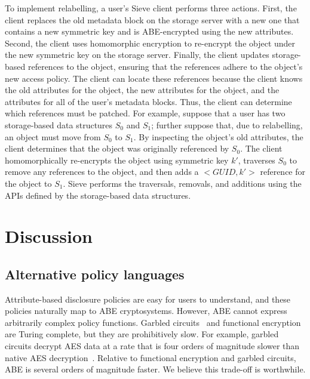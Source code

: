 To implement relabelling, a user's Sieve
client performs three actions. First,
the client replaces the old
metadata block on the storage server with a new one 
that contains a new symmetric key 
and is ABE-encrypted using the new attributes.
Second, the client uses homomorphic encryption to
re-encrypt the object under the new symmetric key 
on the storage server.
Finally, the client updates storage-based
references to the object, ensuring that the
references adhere to the object's new access
policy. The client can locate these references
because the client knows the old attributes
for the object, the new attributes for the
object, and the attributes for all of the user's
metadata blocks. Thus, the client can determine
which references must be patched. For example,
suppose that a user has two storage-based data
structures $S_0$ and $S_1$; further suppose that,
due to relabelling, an object must move from
$S_0$ to $S_1$. By inspecting the object's old
attributes, the client determines that the object
was originally referenced by $S_0$. The client
homomorphically re-encrypts the object using
symmetric key $k'$, traverses $S_0$ to remove
any references to the object, and then adds a
$<GUID, k'>$ reference for the object to $S_1$.
Sieve performs the traversals, removals, and
additions using the APIs defined by the
storage-based data structures.

\section{Discussion}
\label{sec:discussion}

\subsection{Alternative policy languages}
Attribute-based disclosure policies are easy
for users to understand, and these policies
naturally map to ABE cryptosystems. However,
ABE cannot express arbitrarily complex policy
functions. Garbled circuits~\cite{lindell2009proof}
and functional encryption~\cite{boneh2011functional}
are Turing complete, but they are prohibitively
slow. For example, garbled circuits decrypt
AES data at a rate that is four orders of
magnitude slower than native AES decryption~\cite{justGarble}.
Relative to functional encryption and garbled
circuits, ABE is several orders of magnitude
faster. We believe this trade-off is worthwhile.


